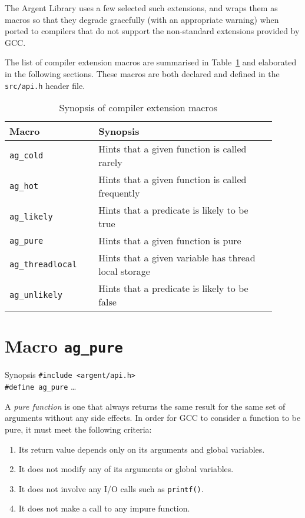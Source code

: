 The Argent Library uses a few selected such extensions, and wraps them as macros
so that they degrade gracefully (with an appropriate warning) when ported to 
compilers that do not support the non-standard extensions provided by GCC.

The list of compiler extension macros are summarised in Table~\ref{tab:synopsis}
and elaborated in the following sections. These macros are both declared and
defined in the \verb|src/api.h| header file.

\renewcommand\arraystretch{1.1}
\begin{table}[!htbp]
  \small
  \centering
  \caption{Synopsis of compiler extension macros}
  \label{tab:synopsis}
  \begin{tabular}[t]{>{\centering}m{0.3\linewidth}
    >{\raggedright\arraybackslash}m{0.6\linewidth}}
    \toprule
    \textbf{Macro} & \textbf{Synopsis} \\
    \midrule
    \verb|ag_cold| & Hints that a given function is called rarely \\
    \verb|ag_hot| & Hints that a given function is called frequently \\
    \verb|ag_likely| & Hints that a predicate is likely to be true \\
    \verb|ag_pure| & Hints that a given function is pure \\
    \verb|ag_threadlocal| & Hints that a given variable has thread local 
      storage \\
    \verb|ag_unlikely| & Hints that a predicate is likely to be false \\
    \bottomrule
  \end{tabular}
\end{table}


%


\section{Macro \texttt{ag\_pure}}

  \begin{bclogo}[logo=\bccrayon, noborder=true, barre=snake, couleurBarre=gray]
    {Synopsis}
    \small
    \verb|#include <argent/api.h>| \\
    \verb|#define ag_pure| \ldots
  \end{bclogo}

  A \emph{pure function} is one that always returns the same result for the same
  set of arguments without any side effects. In order for GCC to consider a
  function to be pure, it must meet the following criteria:
  \begin{enumerate}
    \item Its return value depends only on its arguments and global variables.
    \item It does not modify any of its arguments or global variables.
    \item It does not involve any I/O calls such as \texttt{printf()}.
    \item It does not make a call to any impure function.
  \end{enumerate}

